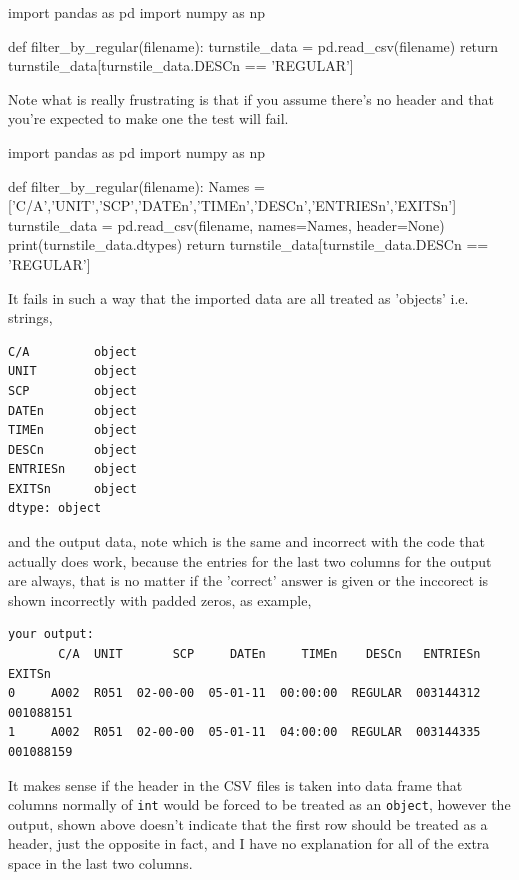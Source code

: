 \documentclass{article}
\numberwithin{questionCtr}{section}
\numberwithin{problemCtr}{section}
\begin{document}
\begin{python1}
import pandas as pd
import numpy as np

def filter_by_regular(filename):
    turnstile_data = pd.read_csv(filename)
    return turnstile_data[turnstile_data.DESCn == 'REGULAR']  
\end{python1}

Note what is really frustrating is that if you assume there's no header and that
you're expected to make one the test will fail.

\begin{python1}
import pandas as pd
import numpy as np

def filter_by_regular(filename):
    Names = ['C/A','UNIT','SCP','DATEn','TIMEn','DESCn','ENTRIESn','EXITSn']
    turnstile_data = pd.read_csv(filename, names=Names, header=None)
    print(turnstile_data.dtypes)
    return turnstile_data[turnstile_data.DESCn == 'REGULAR']
\end{python1}

It fails in such a way that the imported data are all treated as 'objects' i.e. strings,

\begin{verbatim}
C/A         object
UNIT        object
SCP         object
DATEn       object
TIMEn       object
DESCn       object
ENTRIESn    object
EXITSn      object
dtype: object
\end{verbatim}
and the output data, note which is the same and incorrect with the code that
actually does work, because the entries for the last two columns for the output
are always, that is no matter if the 'correct' answer is given or the inccorect
is shown incorrectly with padded zeros, as example,

{\footnotesize
\begin{verbatim}
your output:
       C/A  UNIT       SCP     DATEn     TIMEn    DESCn   ENTRIESn                     EXITSn
0     A002  R051  02-00-00  05-01-11  00:00:00  REGULAR  003144312                 001088151
1     A002  R051  02-00-00  05-01-11  04:00:00  REGULAR  003144335               001088159      
\end{verbatim}}
It makes sense if the header in the CSV files is taken into data frame that
columns normally of \verb|int| would be forced to be treated as an
\verb|object|, however the output, shown above doesn't indicate that the first
row should be treated as a header, just the opposite in fact, and I have no
explanation for all of the extra space in the last two columns.
\end{document}

